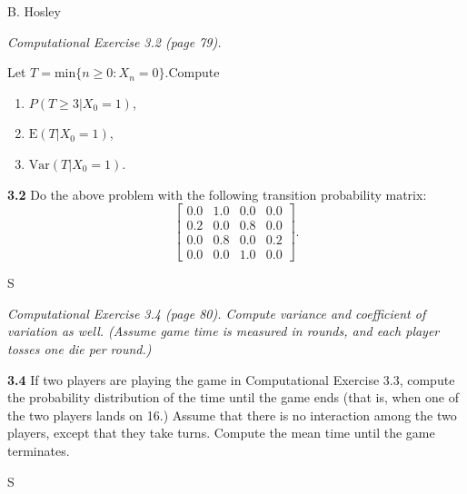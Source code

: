 \documentclass[answers]{exam}
\begin{document}
\hspace{\fill} {\large B. Hosley}
\bigskip


\begin{questions}

\question 
\textit{Computational Exercise 3.2 (page 79).}

Let \(T =\text{min}\{n\geq0:X_n =0\}\).Compute
\begin{enumerate}
	\item \(P(T \geq 3|X_0 = 1)\), 
	\item \(\text{E}(T|X_0 =1)\),
	\item \(\text{Var}(T |X_0 = 1)\).
\end{enumerate}


\textbf{3.2} Do the above problem with the following transition probability matrix:
\[\begin{bmatrix}
	0.0 & 1.0 & 0.0 & 0.0 \\
	0.2 & 0.0 & 0.8 & 0.0 \\
	0.0 & 0.8 & 0.0 & 0.2 \\
	0.0 & 0.0 & 1.0 & 0.0 
\end{bmatrix}.\]

\begin{solution}
	S
\end{solution}

\question 
\textit{Computational Exercise 3.4 (page 80). 
	Compute variance and coefficient of variation as well. 
	(Assume game time is measured in rounds, 
	and each player tosses one die per round.)}


\textbf{3.4} If two players are playing the game in Computational Exercise 3.3, 
compute the probability distribution of the time until the game ends 
(that is, when one of the two players lands on 16.) 
Assume that there is no interaction among the two players, 
except that they take turns. Compute the mean time until the game terminates.

\begin{solution}
	S
\end{solution}


\end{questions}
\end{document}
